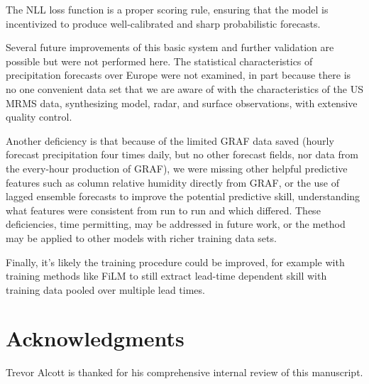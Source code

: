 \documentclass[11pt]{article}
\begin{document}
The NLL loss function is a proper scoring rule, ensuring that the
model is incentivized to produce well-calibrated and sharp
probabilistic forecasts.

Several future improvements of this basic system and further validation are possible
but were not performed here.   The statistical characteristics of precipitation forecasts over
Europe were not examined, in part because there is no one convenient data set that we
are aware of with the characteristics of the US MRMS data, synthesizing model, radar, and
surface observations, with extensive quality control.

Another deficiency is that because of the limited GRAF data saved (hourly forecast precipitation
four times daily, but no other forecast fields, nor data from the every-hour production of GRAF), we
were missing other helpful predictive features such as column relative humidity directly from GRAF, or
the use of lagged ensemble forecasts to improve the potential predictive skill, understanding
what features were consistent from run to run and which differed.  These deficiencies,
time permitting, may be addressed in future work, or the method may be applied to other models
with richer training data sets.

Finally, it's likely the training procedure could be improved,
for example with training methods like FiLM \citep{perez2017} to still
extract lead-time dependent skill with training data pooled over multiple lead times.

\section*{Acknowledgments}

Trevor Alcott is thanked for his comprehensive internal review of this manuscript.

\end{document}
